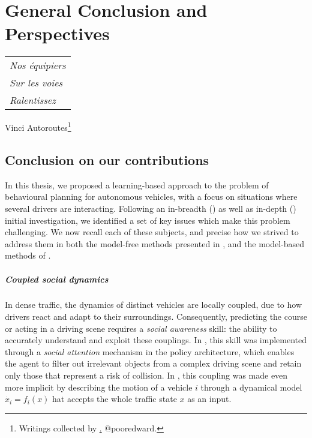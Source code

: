 
\makeatletter
\def\toclevel@chapter{-1}
\makeatother

\chapter{General Conclusion and Perspectives}
\label{chapter:conclusion}

\begin{flushright}
	\begin{tabular}{@{}l@{}}
		\emph{Nos équipiers}\\
		\emph{\hspace*{1.0cm}Sur les voies}\\
		\emph{\hspace*{0.5cm}Ralentissez}\\
	\end{tabular}

	Vinci Autoroutes\footnote{Writings collected by \href{https://twitter.com/pooredward/status/1273249408231124994}.
		{@pooredward}.}\hspace*{1cm}
\end{flushright}

\section{Conclusion on our contributions}
In this thesis, we proposed a learning-based approach to the problem of behavioural planning for autonomous vehicles, with a focus on situations where several drivers are interacting. Following an in-breadth () as well as in-depth () initial investigation, we identified a set of key issues which make this problem challenging. We now recall each of these subjects, and precise how we strived to address them in both the model-free methods presented in , and the model-based methods of .

\paragraph{Coupled social dynamics}
In dense traffic, the dynamics of distinct vehicles are locally coupled, due to how drivers react and adapt to their surroundings. Consequently, predicting the course or acting in a driving scene requires a \emph{social awareness} skill: the ability to accurately understand and exploit these couplings. %
In , this skill was implemented through a \emph{social attention} mechanism in the policy architecture, which enables the agent to filter out irrelevant objects from a complex driving scene and retain only those that represent a risk of collision. In , this coupling was made even more implicit by describing the motion of a vehicle $i$ through a dynamical model $\dot{x_i} = f_i(x)$ hat accepts the whole traffic state $x$ as an input.


